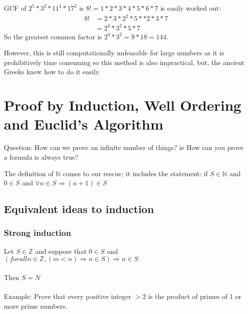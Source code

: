 GCF of $2^5 * 3^2 * 11^4 * 17^3$ is $8! = 1*2*3*4*5*6*7$
is easily worked out:
\begin{align}
  8! & = 2* 3 * 2^2 * 5 * *2 * 3* 7 \\
     & = 2^4 * 3^2 * 5 * 7
\end{align}
So the greatest common factor is $2^4 * 3^2 = 9 * 18 = 144$.

However, this is still computationally unfeasable for large numbers as it is
prohibitively time consuming so this method is also impractical, but, the
ancient Greeks knew how to do it easily.

\section{Proof by Induction, Well Ordering and Euclid's Algorithm}
\label{sec:ProofByInductionWellOrderingAndEuclidsAlgorithm}


Question: How can we prove an infinite number of things? ie How can you prove
a formula is always true?

The definition of $\mathbb{N}$ comes to our rescue; it includes the statement:
if $S \in \mathbb{N}$ and $0 \in S$ and $\forall n \in S \Rightarrow (n + 1) \in S $

\subsection{Equivalent ideas to induction}
\label{sec:EquivalentIdeasToInduction}

\subsubsection{Strong induction}
\label{sec:StrongInduction}
Let $S \in \mathbb{Z}$ and suppose that $0 \in S$ and $(forall n \in \mathbb{Z}, (m < n) \Rightarrow n \in S) \Rightarrow n \in S$ \\
\\
Then $S = N$ \\
\\
Example: Prove that every positive integer $> 2$ is the product of primes of 1
or more prime numbers.\\

